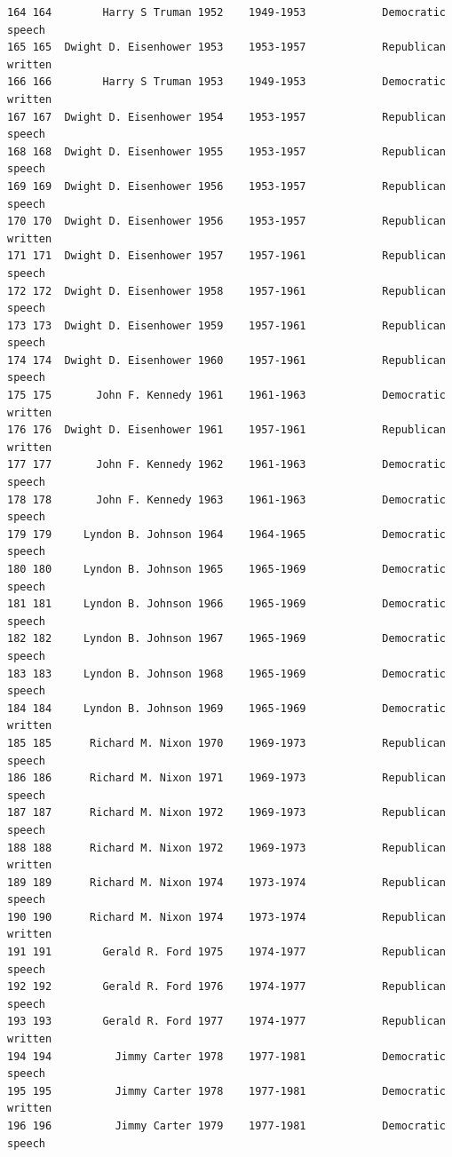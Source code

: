 \documentclass[
  letterpaper,
  DIV=11,
  numbers=noendperiod]{scrreprt}
\begin{document}
\begin{verbatim}
164 164        Harry S Truman 1952    1949-1953            Democratic    speech
165 165  Dwight D. Eisenhower 1953    1953-1957            Republican   written
166 166        Harry S Truman 1953    1949-1953            Democratic   written
167 167  Dwight D. Eisenhower 1954    1953-1957            Republican    speech
168 168  Dwight D. Eisenhower 1955    1953-1957            Republican    speech
169 169  Dwight D. Eisenhower 1956    1953-1957            Republican    speech
170 170  Dwight D. Eisenhower 1956    1953-1957            Republican   written
171 171  Dwight D. Eisenhower 1957    1957-1961            Republican    speech
172 172  Dwight D. Eisenhower 1958    1957-1961            Republican    speech
173 173  Dwight D. Eisenhower 1959    1957-1961            Republican    speech
174 174  Dwight D. Eisenhower 1960    1957-1961            Republican    speech
175 175       John F. Kennedy 1961    1961-1963            Democratic   written
176 176  Dwight D. Eisenhower 1961    1957-1961            Republican   written
177 177       John F. Kennedy 1962    1961-1963            Democratic    speech
178 178       John F. Kennedy 1963    1961-1963            Democratic    speech
179 179     Lyndon B. Johnson 1964    1964-1965            Democratic    speech
180 180     Lyndon B. Johnson 1965    1965-1969            Democratic    speech
181 181     Lyndon B. Johnson 1966    1965-1969            Democratic    speech
182 182     Lyndon B. Johnson 1967    1965-1969            Democratic    speech
183 183     Lyndon B. Johnson 1968    1965-1969            Democratic    speech
184 184     Lyndon B. Johnson 1969    1965-1969            Democratic   written
185 185      Richard M. Nixon 1970    1969-1973            Republican    speech
186 186      Richard M. Nixon 1971    1969-1973            Republican    speech
187 187      Richard M. Nixon 1972    1969-1973            Republican    speech
188 188      Richard M. Nixon 1972    1969-1973            Republican   written
189 189      Richard M. Nixon 1974    1973-1974            Republican    speech
190 190      Richard M. Nixon 1974    1973-1974            Republican   written
191 191        Gerald R. Ford 1975    1974-1977            Republican    speech
192 192        Gerald R. Ford 1976    1974-1977            Republican    speech
193 193        Gerald R. Ford 1977    1974-1977            Republican   written
194 194          Jimmy Carter 1978    1977-1981            Democratic    speech
195 195          Jimmy Carter 1978    1977-1981            Democratic   written
196 196          Jimmy Carter 1979    1977-1981            Democratic    speech

\end{verbatim}
\end{document}
